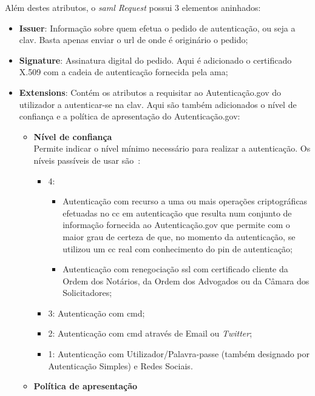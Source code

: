 Além destes atributos, o \textit{\acrshort{saml} Request} possui 3 elementos aninhados:\label{sec:soaAuthCMDReq}
\begin{itemize}
    \item \textbf{Issuer}: Informação sobre quem efetua o pedido de autenticação, ou seja a \acrshort{clav}. 
    Basta apenas enviar o \acrshort{url} de onde é originário o pedido;
    \item \textbf{Signature}: Assinatura digital do pedido. Aqui é adicionado o certificado X.509 com a cadeia de 
    autenticação fornecida pela \acrshort{ama};
    \item \textbf{Extensions}: Contém os atributos a requisitar ao Autenticação.gov do utilizador a autenticar-se 
    na \acrshort{clav}. Aqui são também adicionados o nível de confiança e a política de apresentação do 
    Autenticação.gov:
    \begin{itemize}
        \item \textbf{Nível de confiança} \\
        Permite indicar o nível mínimo necessário para realizar a autenticação. Os níveis passíveis de usar 
        são~\cite{agov2}:
        \begin{itemize}
            \item 4:
            \begin{itemize}
                \item Autenticação com recurso a uma ou mais operações criptográficas efetuadas no \acrlong{cc} 
                em autenticação que resulta num conjunto de informação fornecida ao Autenticação.gov que permite 
                com o maior grau de certeza de que, no momento da autenticação, se utilizou um \acrlong{cc} real 
                com conhecimento do \acrshort{pin} de autenticação;
                \item Autenticação com renegociação \acrshort{ssl} com certificado cliente da Ordem dos Notários, 
                da Ordem dos Advogados ou da Câmara dos Solicitadores;
            \end{itemize}
            \item 3: Autenticação com \acrlong{cmd};
            \item 2: Autenticação com \acrlong{cmd} através de Email ou \textit{Twitter};
            \item 1: Autenticação com Utilizador/Palavra-passe (também designado por Autenticação Simples) e 
            Redes Sociais.
        \end{itemize}
        \item \textbf{Política de apresentação} \\

\end{itemize}
\end{itemize}
